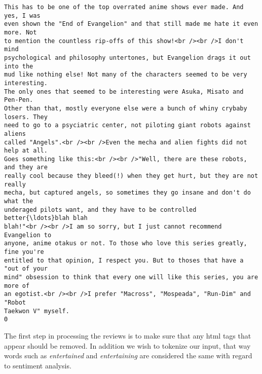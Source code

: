 \documentclass[11pt]{article}
\begin{document}
    \begin{Verbatim}[commandchars=\\\{\}]
This has to be one of the top overrated anime shows ever made. And yes, I was
even shown the "End of Evangelion" and that still made me hate it even more. Not
to mention the countless rip-offs of this show!<br /><br />I don't mind
psychological and philosophy untertones, but Evangelion drags it out into the
mud like nothing else! Not many of the characters seemed to be very interesting.
The only ones that seemed to be interesting were Asuka, Misato and Pen-Pen.
Other than that, mostly everyone else were a bunch of whiny crybaby losers. They
need to go to a psyciatric center, not piloting giant robots against aliens
called "Angels".<br /><br />Even the mecha and alien fights did not help at all.
Goes something like this:<br /><br />"Well, there are these robots, and they are
really cool because they bleed(!) when they get hurt, but they are not really
mecha, but captured angels, so sometimes they go insane and don't do what the
underaged pilots want, and they have to be controlled better{\ldots}blah blah
blah!"<br /><br />I am so sorry, but I just cannot recommend Evangelion to
anyone, anime otakus or not. To those who love this series greatly, fine you're
entitled to that opinion, I respect you. But to thoses that have a "out of your
mind" obsession to think that every one will like this series, you are more of
an egotist.<br /><br />I prefer "Macross", "Mospeada", "Run-Dim" and "Robot
Taekwon V" myself.
0
    \end{Verbatim}

    The first step in processing the reviews is to make sure that any html
tags that appear should be removed. In addition we wish to tokenize our
input, that way words such as \emph{entertained} and \emph{entertaining}
are considered the same with regard to sentiment analysis.
\end{document}
